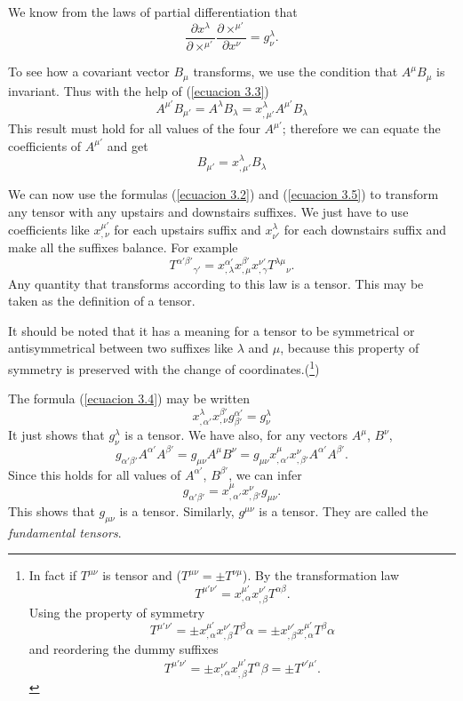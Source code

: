 We know from the laws of partial differentiation that
\begin{equation}
 \label{ecuacion 3.4}
 \frac{\partial x^{\lambda}}{\partial ×^{\mu'}} 
\frac{\partial ×^{\mu'}}{\partial x^{\nu}} = g^{\lambda}_{\nu}.
\end{equation}

To see how a covariant vector $B_{\mu}$ transforms, we use the condition that 
$A^{\mu} B_{\mu}$ is invariant. Thus with the help of (\ref{ecuacion 3.3})
\[
    A^{\mu'} B_{\mu'} 
    = A^{\lambda} B_{\lambda} 
    = x^{\lambda}_{,\mu'}A^{\mu'} B_{\lambda}
\]
This result must hold for all values of the four $A^{\mu'}$; therefore we can 
equate the coefficients of $A^{\mu'}$ and get
\begin{equation}
 \label{ecuacion 3.5}
 B_{\mu'} = x^{\lambda}_{,\mu'} B_{\lambda}
\end{equation}

We can now use the formulas (\ref{ecuacion 3.2}) and (\ref{ecuacion 3.5}) to 
transform any tensor with any upstairs and downstairs suffixes. We just have to 
use coefficients like $x^{\mu'}_{,\nu}$ for each upstairs suffix and 
$x^{\lambda}_{\nu'}$ for each downstairs suffix and make all the suffixes 
balance. For example
\begin{equation}
 \label{ecuacion 3.6}
 {T^{\alpha'\beta'}}_{\gamma'} =
    x^{\alpha'}_{,\lambda}x^{\beta'}_{,\mu}x^{\nu'}_{,\gamma} 
    {T^{\lambda\mu}}_{\nu}.
\end{equation}
Any quantity that transforms according to this law is a tensor. This may be 
taken as the definition of a tensor.

It should be noted that it has a meaning for a tensor to be symmetrical or 
antisymmetrical between two suffixes like $\lambda$ and $\mu$, because this 
property of symmetry is preserved with the change of coordinates.(\footnote{
In fact if $T^{\mu\nu}$ is tensor and ($T^{\mu\nu} = \pm T^{\nu\mu}$). By 
the transformation law 
\[T^{\mu'\nu'} = x^{\mu'}_{,\alpha} x^{\nu'}_{,\beta}T^{\alpha\beta}.\]
Using the property of symmetry
\[T^{\mu'\nu'} = \pm x^{\mu'}_{,\alpha} x^{\nu'}_{,\beta}T^{\beta}\alpha
               = \pm x^{\nu'}_{,\beta}  x^{\mu'}_{,\alpha}T^{\beta}\alpha\]
and reordering the dummy suffixes
\[T^{\mu'\nu'} = \pm x^{\nu'}_{,\alpha} x^{\mu'}_{,\beta}T^{\alpha}\beta
               = \pm T^{\nu'\mu'}.\]
})

The formula (\ref{ecuacion 3.4}) may be written
\[
    x^{\lambda}_{,\alpha'}x^{\beta'}_{,\nu} 
    g^{\alpha'}_{\beta'} = g^{\lambda}_{\nu}
\]
It just shows that $g^{\lambda}_{\nu}$ is a tensor. We have also, for any 
vectors $A^\mu$, $B^\nu$,
\[
    g_{\alpha'\beta'} A^{\alpha'} A^{\beta'} = g_{\mu\nu} A^\mu B^\nu
    = g_{\mu\nu} x^{\mu}_{,\alpha'} x^{\nu}_{,\beta'} A^{\alpha'} A^{\beta'}.
\]
Since this holds for all values of $A^{\alpha'}$, $B^{\beta'}$, we can infer
\begin{equation}
 \label{equation 3.7}
 g_{\alpha'\beta'} = x^{\mu}_{,\alpha'} x^{\nu}_{,\beta'} g_{\mu\nu}.
\end{equation}
This shows that $g_{\mu\nu}$ is a tensor. Similarly, $g^{\mu\nu}$ is a tensor. 
They are called the \emph{fundamental tensors}.

